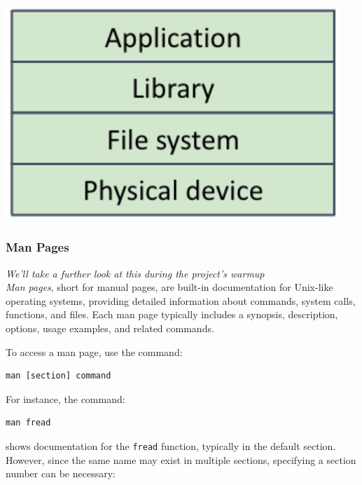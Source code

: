 \documentclass[../../compsys.tex]{subfiles}
\begin{document}
\begin{minipage}{0.25\textwidth}
\begin{center}
  \includegraphics[width=0.95\textwidth]{chapters/L6/images/layers.png}
\end{center}
\end{minipage}

\newpage
\subsubsection{Man Pages}
\textit{We'll take a further look at this during the project's warmup}\\
\textit{Man pages}, short for manual pages, are built-in documentation for Unix-like operating systems, providing detailed information about commands, system calls, functions, and files. Each man page typically includes a synopsis, description, options, usage examples, and related commands.

To access a man page, use the command:
\begin{center}
\begin{verbatim}
man [section] command
\end{verbatim}
\end{center}

For instance, the command:
\begin{center}
\begin{verbatim}
man fread
\end{verbatim}
\end{center}

shows documentation for the \texttt{fread} function, typically in the default section. However, since the same name may exist in multiple sections, specifying a section number can be necessary:
\end{document}

